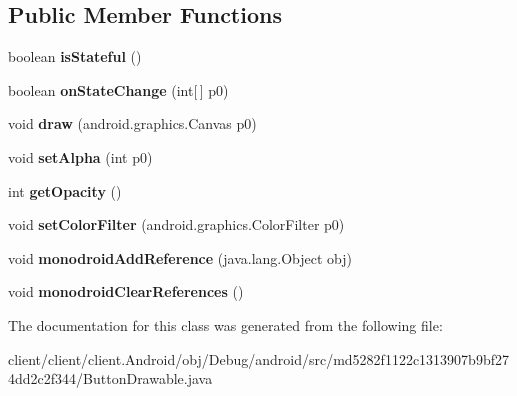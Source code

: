 \subsection*{Public Member Functions}
\begin{DoxyCompactItemize}
\item 
\hypertarget{classmd5282f1122c1313907b9bf274dd2c2f344_1_1ButtonDrawable_a0fe8919b17f8dd99c4403192f72ae0f0}{}boolean {\bfseries is\+Stateful} ()\label{classmd5282f1122c1313907b9bf274dd2c2f344_1_1ButtonDrawable_a0fe8919b17f8dd99c4403192f72ae0f0}

\item 
\hypertarget{classmd5282f1122c1313907b9bf274dd2c2f344_1_1ButtonDrawable_aac6c481bb17164753929f4db3bca71c7}{}boolean {\bfseries on\+State\+Change} (int\mbox{[}$\,$\mbox{]} p0)\label{classmd5282f1122c1313907b9bf274dd2c2f344_1_1ButtonDrawable_aac6c481bb17164753929f4db3bca71c7}

\item 
\hypertarget{classmd5282f1122c1313907b9bf274dd2c2f344_1_1ButtonDrawable_ae59a6395e517037acd3cb2e1ff388c8a}{}void {\bfseries draw} (android.\+graphics.\+Canvas p0)\label{classmd5282f1122c1313907b9bf274dd2c2f344_1_1ButtonDrawable_ae59a6395e517037acd3cb2e1ff388c8a}

\item 
\hypertarget{classmd5282f1122c1313907b9bf274dd2c2f344_1_1ButtonDrawable_a5f369c9b0b763fc124fe38b2cdb3484f}{}void {\bfseries set\+Alpha} (int p0)\label{classmd5282f1122c1313907b9bf274dd2c2f344_1_1ButtonDrawable_a5f369c9b0b763fc124fe38b2cdb3484f}

\item 
\hypertarget{classmd5282f1122c1313907b9bf274dd2c2f344_1_1ButtonDrawable_a67a0b0f43d7f3edc51a38f722e3d2874}{}int {\bfseries get\+Opacity} ()\label{classmd5282f1122c1313907b9bf274dd2c2f344_1_1ButtonDrawable_a67a0b0f43d7f3edc51a38f722e3d2874}

\item 
\hypertarget{classmd5282f1122c1313907b9bf274dd2c2f344_1_1ButtonDrawable_abdabd03c7e275297942c0488c9235013}{}void {\bfseries set\+Color\+Filter} (android.\+graphics.\+Color\+Filter p0)\label{classmd5282f1122c1313907b9bf274dd2c2f344_1_1ButtonDrawable_abdabd03c7e275297942c0488c9235013}

\item 
\hypertarget{classmd5282f1122c1313907b9bf274dd2c2f344_1_1ButtonDrawable_aef2209d4fd8b729bb2ef5432efe12318}{}void {\bfseries monodroid\+Add\+Reference} (java.\+lang.\+Object obj)\label{classmd5282f1122c1313907b9bf274dd2c2f344_1_1ButtonDrawable_aef2209d4fd8b729bb2ef5432efe12318}

\item 
\hypertarget{classmd5282f1122c1313907b9bf274dd2c2f344_1_1ButtonDrawable_a3584aed85610deb4e9fa32a551e5b35b}{}void {\bfseries monodroid\+Clear\+References} ()\label{classmd5282f1122c1313907b9bf274dd2c2f344_1_1ButtonDrawable_a3584aed85610deb4e9fa32a551e5b35b}

\end{DoxyCompactItemize}


The documentation for this class was generated from the following file\+:\begin{DoxyCompactItemize}
\item 
client/client/client.\+Android/obj/\+Debug/android/src/md5282f1122c1313907b9bf274dd2c2f344/Button\+Drawable.\+java\end{DoxyCompactItemize}
